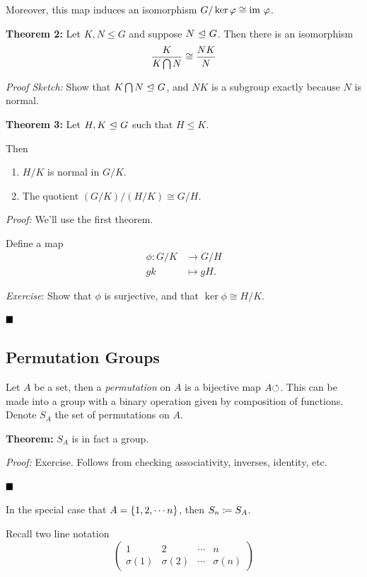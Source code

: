 Moreover, this map induces an isomorphism
\(G /\ker \varphi \cong {\text{im}~} \varphi\).

\textbf{Theorem 2:} Let \(K, N \leq G\) and suppose \(N {~\trianglelefteq~} G\).
Then there is an isomorphism \[
\frac K {K \bigcap N} \cong \frac {NK} {N}
\]

\emph{Proof Sketch:} Show that \(K \bigcap N {~\trianglelefteq~} G\), and \(NK\)
is a subgroup exactly because \(N\) is normal.

\textbf{Theorem 3:} Let \(H, K {~\trianglelefteq~} G\) such that \(H \leq K\).

Then

\begin{enumerate}
\def\labelenumi{\arabic{enumi}.}
\item
  \(H/K\) is normal in \(G/K\).
\item
  The quotient \((G/K) / (H/K) \cong G/H\).
\end{enumerate}

\emph{Proof:} We'll use the first theorem.

Define a map \begin{align*}
\phi: G/K &\to G/H \\
gk &\mapsto gH
.\end{align*}

\emph{Exercise}: Show that \(\phi\) is surjective, and that
\(\ker \phi \cong H/K\).

\(\qed\)

\hypertarget{permutation-groups}{%
\subsection{Permutation Groups}\label{permutation-groups}}

Let \(A\) be a set, then a \emph{permutation} on \(A\) is a bijective
map \(A {\circlearrowleft}\). This can be made into a group with a binary
operation given by composition of functions. Denote \(S_{A}\) the set of
permutations on \(A\).

\textbf{Theorem:} \(S_{A}\) is in fact a group.

\emph{Proof:} Exercise. Follows from checking associativity, inverses,
identity, etc.

\(\qed\)

In the special case that \(A = \left\{{1, 2, \cdots n}\right\}\), then
\(S_{n} \coloneqq S_{A}\).

Recall two line notation \[
\left(\begin{matrix}
1 & 2 & \cdots & n\\
\sigma(1) & \sigma(2) & \cdots & \sigma(n)
\end{matrix}\right)
\]

